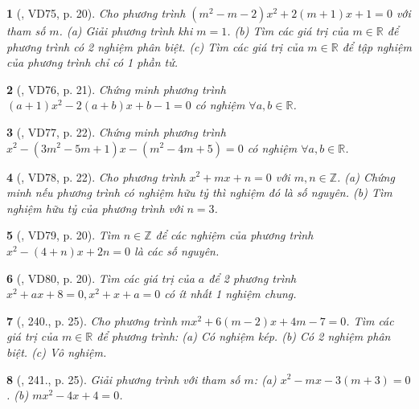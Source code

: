\documentclass{article}
\newtheorem{baitoan}{}
\begin{document}
\begin{baitoan}[\cite{Binh_Toan_9_tap_2}, VD75, p. 20]
	Cho phương trình $(m^2 - m - 2)x^2 + 2(m + 1)x + 1 = 0$ với tham số $m$. (a) Giải phương trình khi $m = 1$. (b) Tìm các giá trị của $m\in\mathbb{R}$ để phương trình có 2 nghiệm phân biệt. (c) Tìm các giá trị của $m\in\mathbb{R}$ để tập nghiệm của phương trình chỉ có 1 phần tử.
\end{baitoan}

\begin{baitoan}[\cite{Binh_Toan_9_tap_2}, VD76, p. 21]
	Chứng minh phương trình $(a + 1)x^2 - 2(a + b)x + b - 1 = 0$ có nghiệm $\forall a,b\in\mathbb{R}$.
\end{baitoan}

\begin{baitoan}[\cite{Binh_Toan_9_tap_2}, VD77, p. 22]
	Chứng minh phương trình $x^2 - (3m^2 - 5m + 1)x - (m^2 - 4m + 5) = 0$ có nghiệm $\forall a,b\in\mathbb{R}$.
\end{baitoan}

\begin{baitoan}[\cite{Binh_Toan_9_tap_2}, VD78, p. 22]
	Cho phương trình $x^2 + mx + n = 0$ với $m,n\in\mathbb{Z}$. (a) Chứng minh nếu phương trình có nghiệm hữu tỷ thì nghiệm đó là số nguyên. (b) Tìm nghiệm hữu tỷ của phương trình với $n = 3$.
\end{baitoan}

\begin{baitoan}[\cite{Binh_Toan_9_tap_2}, VD79, p. 20]
	Tìm $n\in\mathbb{Z}$ để các nghiệm của phương trình $x^2 - (4 + n)x + 2n = 0$ là các số nguyên.
\end{baitoan}

\begin{baitoan}[\cite{Binh_Toan_9_tap_2}, VD80, p. 20]
	Tìm các giá trị của $a$ để 2 phương trình $x^2 + ax + 8 = 0,x^2 + x + a = 0$ có ít nhất 1 nghiệm chung.
\end{baitoan}

\begin{baitoan}[\cite{Binh_Toan_9_tap_2}, 240., p. 25]
	Cho phương trình $mx^2 + 6(m - 2)x + 4m - 7 = 0$. Tìm các giá trị của $m\in\mathbb{R}$ để phương trình: (a) Có nghiệm kép. (b) Có 2 nghiệm phân biệt. (c) Vô nghiệm.
\end{baitoan}

\begin{baitoan}[\cite{Binh_Toan_9_tap_2}, 241., p. 25]
	Giải phương trình với tham số $m$: (a) $x^2 - mx - 3(m + 3) = 0$. (b) $mx^2 - 4x + 4 = 0$.
\end{baitoan}
\end{document}
